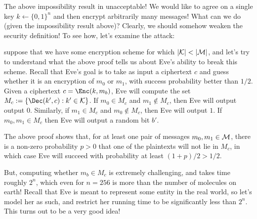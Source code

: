     The above impossibility result in unacceptable! We would like to agree on a single key $k\gets\{0,1\}^n$ and then encrypt arbitrarily many messages!  What can we do (given the impossibility result above)?  Clearly, we should somehow weaken the security definition!
To see how, let's examine the attack:  

suppose that we have some encryption scheme for which $|{\cal K}|<|{\cal M}|$, 
and let’s try to understand what the above proof tells us about Eve’s ability to break this scheme. Recall that Eve’s goal is to take as input a ciphertext $c$ and guess whether it is an encryption of $m_0$ or $m_1$, with success probability better than $1/2$. 
Given a ciphertext $c = \Enc(k,m_b)$, 
Eve will compute the set 
$M_c :=\{\Dec(k',c) : k' \in{\cal K} \}$. 
If $m_0\in M_c$ and $m_1\notin M_c$, then Eve will output output $0$. Similarly, if $m_1\in M_c$ and $m_0\notin M_c$, then Eve will output $1$. If $m_0,m_1 \in M_c$ then Eve will output a random bit $b'$.   

The above proof shows that, for at least one pair of messages $m_0,m_1\in {\cal M}$, there is a non-zero probability $p > 0$ that one of the plaintexts will not lie in $M_c$, in which case Eve will succeed with probability at least $(1 + p)/2 > 1/2$. 

But, computing whether $m_b\in M_c$ is extremely challenging, and takes time roughly $2^n$, which even for $n=256$ is more than the number of molecules on earth!  Recall that Eve is meant to represent some entity in the real world, so let's model her as such, and restrict her running time to be significantly less than $2^n$. This turns out to be a very good idea!
    